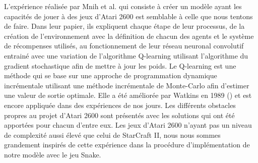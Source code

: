 \documentclass{article}
\begin{document}
L'expérience réalisée par Mnih et al. \cite{DBLP:journals/corr/MnihKSGAWR13} qui consiste à créer un modèle ayant les capacités de jouer à des jeux d'Atari 2600 est semblable à celle que nous tentons de faire. Dans leur papier, ils expliquent chaque étape de leur processus, de la création de l'environnement avec la définition de chacun des agents et le système de récompenses utilisés, au fonctionnement de leur réseau neuronal convolutif entrainé avec une variation de l'algorithme Q-learning utilisant l'algorithme du gradient stochastique afin de mettre à jour les poids. Le Q-learning est une méthode qui se base sur une approche de programmation dynamique incrémentale utilisant une méthode incrémentale de Monte-Carlo afin d'estimer une valeur de sortie optimale. Elle a été améliorée par Watkins en 1989 (\cite{article}) et est encore appliquée dans des expériences de nos jours. Les différents obstacles propres au projet d'Atari 2600 sont présentés avec les solutions qui ont été apportées pour chacun d'entre eux. Les jeux d'Atari 2600 n'ayant pas un niveau de complexité aussi élevé que celui de StarCraft II, nous nous sommes grandement inspirés de cette expérience dans la procédure d'implémentation de notre modèle avec le jeu Snake.
\end{document}
